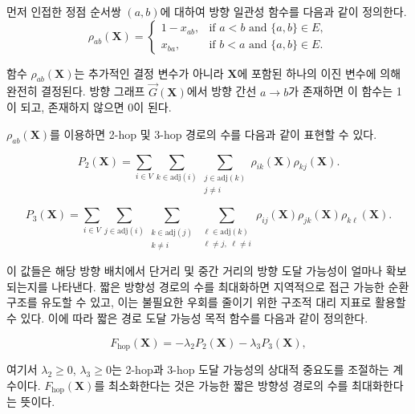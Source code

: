 \documentclass[11pt,a4paper]{article}
\begin{document}
먼저 인접한 정점 순서쌍 $(a, b)$에 대하여 방향 일관성 함수를
다음과 같이 정의한다.
\begin{equation}
    \rho_{ab}(\mathbf{X})
    =
    \begin{cases}
    1-x_{ab}, & \text{if } a<b \text{ and } \{a,b\}\in E,\\
    x_{ba}, & \text{if } b<a \text{ and } \{a,b\}\in E.
    \end{cases}
\end{equation}

함수 $\rho_{ab}(\mathbf{X})$는 추가적인 결정 변수가 아니라
$\mathbf{X}$에 포함된 하나의 이진 변수에 의해 완전히 결정된다.
방향 그래프 $\vec{G}(\mathbf{X})$에서 방향 간선 $a \to b$가 존재하면
이 함수는 1이 되고, 존재하지 않으면 0이 된다.

$\rho_{ab}(\mathbf{X})$를 이용하면 2-hop 및 3-hop 경로의 수를 다음과 같이
표현할 수 있다.

\begin{equation}
    P_2(\mathbf{X})
    =
    \sum_{i\in V}
    \sum_{k\in \mathrm{adj}(i)}
    \sum_{\substack{j\in \mathrm{adj}(k)\\j\neq i}}
    \rho_{ik}(\mathbf{X})
    \rho_{kj}(\mathbf{X}).
\end{equation}


\begin{equation}
    P_3(\mathbf{X})
    =
    \sum_{i\in V}
    \sum_{j\in \mathrm{adj}(i)}
    \sum_{\substack{k\in \mathrm{adj}(j)\\k\neq i}}
    \sum_{\substack{\ell\in \mathrm{adj}(k)\\\ell\neq j,\;\ell\neq i}}
    \rho_{ij}(\mathbf{X})
    \rho_{jk}(\mathbf{X})
    \rho_{k\ell}(\mathbf{X}).
\end{equation}

이 값들은 해당 방향 배치에서 단거리 및 중간 거리의 방향 도달 가능성이
얼마나 확보되는지를 나타낸다.
짧은 방향성 경로의 수를 최대화하면 지역적으로 접근 가능한 순환 구조를
유도할 수 있고, 이는 불필요한 우회를 줄이기 위한 구조적 대리 지표로
활용할 수 있다.
이에 따라 짧은 경로 도달 가능성 목적 함수를 다음과 같이 정의한다.

\begin{equation}
    F_{\mathrm{hop}}(\mathbf{X})
    =
    -\lambda_2 P_2(\mathbf{X})
    -
    \lambda_3 P_3(\mathbf{X}),
\end{equation}

여기서 $\lambda_2 \ge 0$, $\lambda_3 \ge 0$는 2-hop과 3-hop 도달 가능성의
상대적 중요도를 조절하는 계수이다.
$F_{\mathrm{hop}}(\mathbf{X})$를 최소화한다는 것은 가능한 짧은 방향성
경로의 수를 최대화한다는 뜻이다.
\end{document}
